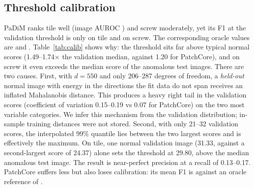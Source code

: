 \subsection{Threshold calibration}
\label{sec:calib}
PaDiM ranks tile well (image AUROC \pdImgAurocTile{}) and screw moderately, yet its F1 at the validation threshold is only \pdImgFoneTile{} on tile and \pdImgFoneScrew{} on screw.
The corresponding oracle values are \pdImgFmaxTile{} and \pdImgFmaxScrew{}.
Table~\ref{tab:calib} shows why: the threshold sits far above typical normal scores (1.49--1.74$\times$ the validation median, against 1.20 for PatchCore), and on screw it even exceeds the median score of the anomalous test images.
There are two causes.
First, with $d=550$ and only 206--287 degrees of freedom, a \emph{held-out} normal image with energy in the directions the fit data do not span receives an inflated Mahalanobis distance.
This produces a heavy right tail in the validation scores (coefficient of variation 0.15--0.19 vs 0.07 for PatchCore) on the two most variable categories.
We infer this mechanism from the validation distribution; in-sample training distances were not stored.
Second, with only 21--32 validation scores, the interpolated 99\% quantile lies between the two largest scores and is effectively the maximum. On tile, one normal validation image (31.33, against a second-largest score of 24.37) alone sets the threshold at 29.80, above the median anomalous test image.
The result is near-perfect precision at a recall of 0.13--0.17.
PatchCore suffers less but also loses calibration: its mean F1 is \pcImgFoneAll{} against an oracle reference of \pcImgFmaxAll{}.

\begin{table}[t]
  \centering
  \caption{Calibration on screw and tile. All statistics are image scores; the threshold is the 99\% quantile of the normal validation scores.}
  \label{tab:calib}
  \footnotesize
  
\end{table}
